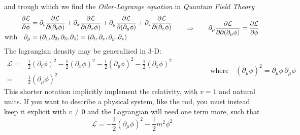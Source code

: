 \documentclass[class=article]{standalone}
\begin{document}
and trough which we find the \emph{Oiler-Lagrange equation} in \emph{Quantum Field Theory}
\begin{equation*}
\begin{split}
\pdv{\mathcal{L}}{\phi} & = \partial_t \pdv{\mathcal{L}}{(\partial_t \phi)} + \partial_x \pdv{\mathcal{L}}{(\partial_x \phi)}  
+\partial_y \pdv{\mathcal{L}}{(\partial_y \phi)} +\partial_z \pdv{\mathcal{L}}{(\partial_z \phi)} \\
\mbox{with} \quad \partial_{\mu} & = (\partial_1, \partial_2, \partial_3, \partial_4) = (\partial_t, \partial_x, \partial_y, \partial_z)
\end{split}
\quad\quad\Rightarrow\quad\quad
\begin{split}
\partial_{\mu} \pdv{\mathcal{L}}{\partial (\partial_{\mu} \phi)} = \pdv{\mathcal{L}}{\phi}
\end{split}
\end{equation*}
The lagrangian density may be generalized in 3-D:
\begin{equation*}
\begin{split}
\mathcal{L} = & \frac{1}{2} (\partial_t \phi)^2 - \frac{1}{2} (\partial_x \phi)^2 - \frac{1}{2} (\partial_y \phi)^2 - \frac{1}{2} (\partial_z \phi)^2 \\
= &  \frac{1}{2} (\partial_{\mu} \phi)^2
\end{split}
\quad\quad\quad\quad\quad \mbox{where} \quad (\partial_{\mu} \phi)^2  = \partial_{\mu} \phi \,\partial_{\mu} \phi
\end{equation*}
This shorter notation implicitly implement the relativity, with $v=1$ and natural units.
If you want to describe a physical system, like the rod, you must instead keep it explicit with $v \neq 0$ 
and the Lagrangian will need one term more, such that
\begin{equation*}
\mathcal{L} = - \frac{1}{2} (\partial_{\mu} \phi)^2 - \frac{1}{2} m^2 \phi^2
\end{equation*}
\end{document}
